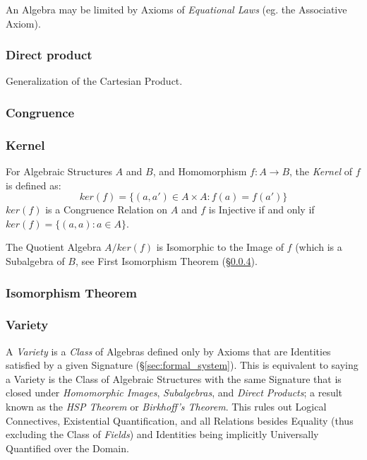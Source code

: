 An Algebra may be limited by Axioms of \emph{Equational Laws} (eg. the
Associative Axiom).



\subsubsection{Direct product}\label{subsec:direct_product}

Generalization of the Cartesian Product.



\subsubsection{Congruence}\label{subsec:general_congruence}



\subsubsection{Kernel}\label{subsec:general_kernel}

For Algebraic Structures $A$ and $B$, and Homomorphism $f: A
\rightarrow B$, the \emph{Kernel} of $f$ is defined as:
\[
    ker(f) = \{ (a,a') \in A \times A : f(a) = f(a') \}
\]
$ker(f)$ is a Congruence Relation on $A$ and $f$ is Injective if and
only if $ker(f) = \{(a,a) : a \in A\}$.

The Quotient Algebra $A/ker(f)$ is Isomorphic to the Image of $f$
(which is a Subalgebra of $B$, see First Isomorphism Theorem
(\S\ref{subsec:isomorphism_theorem}).



\subsubsection{Isomorphism Theorem}\label{subsec:isomorphism_theorem}



\subsubsection{Variety}\label{subsec:model_variety}

A \emph{Variety} is a \emph{Class} of Algebras defined only by Axioms
that are Identities satisfied by a given Signature
(\S\ref{sec:formal_system}). This is equivalent to saying a Variety
is the Class of Algebraic Structures with the same Signature that is
closed under \emph{Homomorphic Images}, \emph{Subalgebras}, and
\emph{Direct Products}; a result known as the \emph{HSP Theorem} or
\emph{Birkhoff's Theorem}\cite{birkhoff35}. This rules out Logical
Connectives, Existential Quantification, and all Relations besides
Equality (thus excluding the Class of \emph{Fields}) and Identities
being implicitly Universally Quantified over the Domain.

